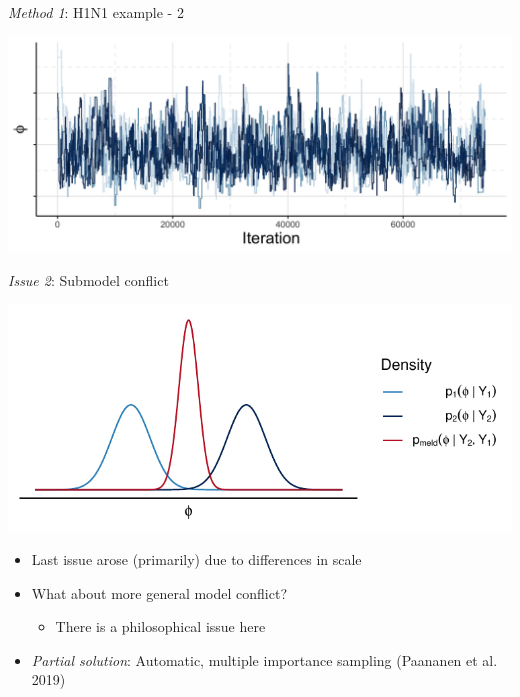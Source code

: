 \documentclass[10pt,ignorenonframetext,]{beamer}
\providecommand{\tightlist}{%
  \setlength{\itemsep}{0pt}\setlength{\parskip}{0pt}}
\begin{document}
\begin{frame}{\emph{Method 1}: H1N1 example - 2}



\begin{center}\includegraphics[width=1\linewidth]{figures/stage-two-trace-presentation-two} \end{center}

\end{frame}

\begin{frame}{\emph{Issue 2}: Submodel conflict}

\begin{center}\includegraphics[width=1\linewidth]{figures/subpost-disagreement} \end{center}

\begin{itemize}
\tightlist
\item
  Last issue arose (primarily) due to differences in scale
\item
  What about more general model conflict?

  \begin{itemize}
  \tightlist
  \item
    There is a philosophical issue here
  \end{itemize}
\item
  \emph{Partial solution}: Automatic, multiple importance sampling
  (Paananen et al. 2019)
\end{itemize}

\end{frame}
\end{document}
